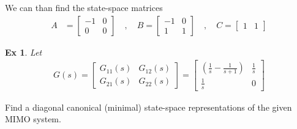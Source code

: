 \documentclass[twoside]{article}
\newtheorem{exmp}[theorem]{Ex}
\begin{document}
%
We can than find the state-space matrices 
%
\begin{align*}
A &= \left[ \begin{array}{ccc} -1 & 0 \\ 0 & 0  \end{array} \right]
\quad , \quad 
B = \left[ \begin{array}{cc} -1 & 0 \\  1 & 1 \end{array} \right]
\quad , \quad 
	C = \left[ \begin{array}{cc} 1  & 1  \end{array} \right]
\end{align*}
% 

\begin{exmp}
Let %
\begin{align*}
	G(s) = \left[ \begin{array}{cc} G_{11}(s) & G_{12}(s) \\ G_{21}(s) & G_{22}(s) \end{array} \right]  =  \left[ \begin{array}{cc} \left( \frac{ 1 }{ s }  - \frac{ 1 }{ s + 1 } \right) &
	        \frac{ 1 }{ s }  \\ 	\frac{ 1 }{ s } & 0  \end{array} \right] 
\end{align*}
%  
\end{exmp}
%
Find a diagonal canonical (minimal) state-space representations of the given MIMO system.
\end{document}
